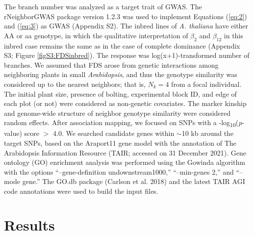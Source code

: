 \documentclass[12pt,]{article}
\begin{document}
The branch number was analyzed as a target trait of GWAS. The rNeighborGWAS package version 1.2.3 \citep{sato2019neighbor} was used to implement Equations (\ref{eq:2}) and (\ref{eq:3}) as GWAS (Appendix S2). The inbred lines of \textit{A. thaliana} have either AA or aa genotype, in which the qualitative interpretation of $\beta_2$ and $\beta_{12}$ in this inbred case remains the same as in the case of complete dominance (Appendix S3; Figure \ref{figS3:FDSinbred}). The response was log(x+1)-transformed number of branches. We assumed that FDS arose from genetic interactions among neighboring plants in small \textit{Arabidopsis}, and thus the genotype similarity was considered up to the nearest neighbors; that is, $N_k=4$ from a focal individual. The initial plant size, presence of bolting, experimental block ID, and edge of each plot (or not) were considered as non-genetic covariates. The marker kinship and genome-wide structure of neighbor genotype similarity were considered random effects. After association mapping, we focused on SNPs with a -log\textsubscript{10}(\textit{p}-value) score $>$ 4.0. We searched candidate genes within $\sim$10 kb around the target SNPs, based on the Araport11 gene model with the annotation of The Arabidopsis Information Resource (TAIR; accessed on 31 December 2021). Gene ontology (GO) enrichment analysis was performed using the Gowinda algorithm \citep{kofler2012gowinda} with the options “--gene-definition undownstream1000,” “--min-genes 2,” and “--mode gene.” The GO.db package (Carlson et al. 2018) and the latest TAIR AGI code annotations were used to build the input files.


\section{Results}
\end{document}
